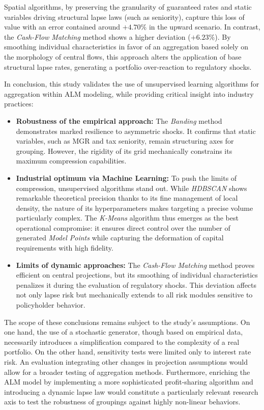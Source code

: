 Spatial algorithms, by preserving the granularity of guaranteed rates and static variables driving structural lapse laws (such as seniority), capture this loss of value with an error contained around $+4.70\%$ in the upward scenario. In contrast, the \textit{Cash-Flow Matching} method shows a higher deviation ($+6.23\%$). By smoothing individual characteristics in favor of an aggregation based solely on the morphology of central flows, this approach alters the application of base structural lapse rates, generating a portfolio over-reaction to regulatory shocks.

In conclusion, this study validates the use of unsupervised learning algorithms for aggregation within ALM modeling, while providing critical insight into industry practices:

\begin{itemize}
    \item \textbf{Robustness of the empirical approach:} The \textit{Banding} method demonstrates marked resilience to asymmetric shocks. It confirms that static variables, such as MGR and tax seniority, remain structuring axes for grouping. However, the rigidity of its grid mechanically constrains its maximum compression capabilities.
    \item \textbf{Industrial optimum via Machine Learning:} To push the limits of compression, unsupervised algorithms stand out. While \textit{HDBSCAN} shows remarkable theoretical precision thanks to its fine management of local density, the nature of its hyperparameters makes targeting a precise volume particularly complex. The \textit{K-Means} algorithm thus emerges as the best operational compromise: it ensures direct control over the number of generated \textit{Model Points} while capturing the deformation of capital requirements with high fidelity.
    \item \textbf{Limits of dynamic approaches:} The \textit{Cash-Flow Matching} method proves efficient on central projections, but its smoothing of individual characteristics penalizes it during the evaluation of regulatory shocks. This deviation affects not only lapse risk but mechanically extends to all risk modules sensitive to policyholder behavior.
\end{itemize}

The scope of these conclusions remains subject to the study's assumptions. On one hand, the use of a stochastic generator, though based on empirical data, necessarily introduces a simplification compared to the complexity of a real portfolio. On the other hand, sensitivity tests were limited only to interest rate risk. An evaluation integrating other changes in projection assumptions would allow for a broader testing of aggregation methods. Furthermore, enriching the ALM model by implementing a more sophisticated profit-sharing algorithm and introducing a dynamic lapse law would constitute a particularly relevant research axis to test the robustness of groupings against highly non-linear behaviors.

